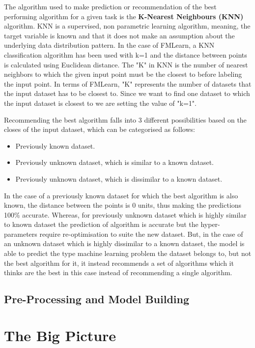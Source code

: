 The algorithm used to make prediction or recommendation of the best performing algorithm for a given task is the \textbf{K-Nearest Neighbours (KNN)} algorithm. KNN is a supervised, non parametric learning algorithm, meaning, the target variable is known and that it does not make an assumption about the underlying data distribution pattern. In the case of FMLearn, a KNN classification algorithm has been used with k=1 and the distance between points is calculated using Euclidean distance. The "K" in KNN is the number of nearest neighbors to which the given input point must be the closest to before labeling the input point. In terms of FMLearn, "K" represents the number of datasets that the input dataset has to be closest to. Since we want to find one dataset to which the input dataset is closest to we are setting the value of "k=1". 

Recommending the best algorithm falls into 3 different possibilities based on the closes of the input dataset, which can be categorised as follows:
\begin{itemize}
    \item Previously known dataset.
    \item Previously unknown dataset, which is similar to a known dataset.
    \item Previously unknown dataset, which is dissimilar to a known dataset.
\end{itemize}

 In the case of a previously known dataset for which the best algorithm is also known, the distance between the points is 0 units, thus making the predictions 100\% accurate. Whereas, for previously unknown dataset which is highly similar to known dataset the prediction of algorithm is accurate but the hyper-parameters require re-optimisation to suite the new dataset. But, in the case of an unknown dataset which is highly dissimilar to a known dataset, the model is able to predict the type machine learning problem the dataset belongs to, but not the best algorithm for it, it instead recommends a set of algorithms which it thinks are the best in this case instead of recommending a single algorithm.
   

\subsection{Pre-Processing and Model Building}
\label{model-building}


\section{The Big Picture}



